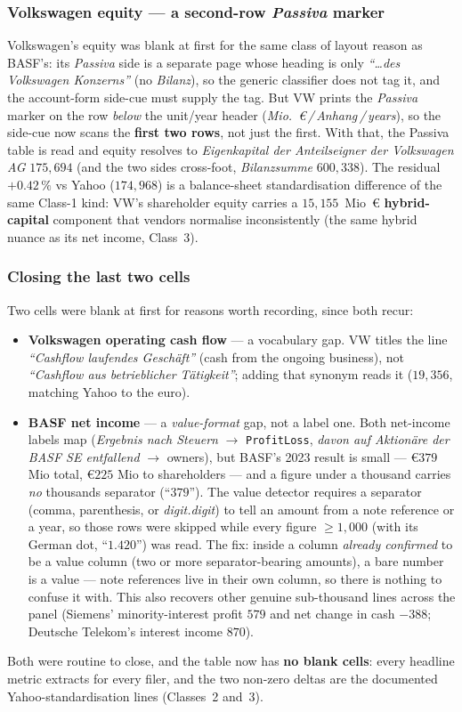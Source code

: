 \documentclass[11pt,a4paper]{report}
\begin{document}
\subsubsection*{Volkswagen equity --- a second-row \emph{Passiva} marker}
Volkswagen's equity was blank at first for the same class of layout reason as BASF's: its \emph{Passiva} side
is a separate page whose heading is only \emph{``\ldots des Volkswagen Konzerns''} (no \emph{Bilanz}), so the
generic classifier does not tag it, and the account-form side-cue must supply the tag. But VW prints the
\emph{Passiva} marker on the row \emph{below} the unit/year header (\emph{Mio.\ €\,/\,Anhang\,/\,years}), so
the side-cue now scans the \textbf{first two rows}, not just the first. With that, the Passiva table is read
and equity resolves to \emph{Eigenkapital der Anteilseigner der Volkswagen AG} $175{,}694$ (and the two sides
cross-foot, \emph{Bilanzsumme} $600{,}338$). The residual \textbf{$+0.42\,\%$} vs Yahoo ($174{,}968$) is a
balance-sheet standardisation difference of the same Class-1 kind: VW's shareholder equity carries a
$15{,}155$~Mio~€ \textbf{hybrid-capital} component that vendors normalise inconsistently (the same hybrid
nuance as its net income, Class~3).

\subsubsection*{Closing the last two cells}
Two cells were blank at first for reasons worth recording, since both recur:
\begin{itemize}
  \item \textbf{Volkswagen operating cash flow} --- a vocabulary gap. VW titles the line \emph{``Cashflow
    laufendes Gesch\"aft''} (cash from the ongoing business), not \emph{``Cashflow aus betrieblicher
    T\"atigkeit''}; adding that synonym reads it ($19{,}356$, matching Yahoo to the euro).
  \item \textbf{BASF net income} --- a \emph{value-format} gap, not a label one. Both net-income labels map
    (\emph{Ergebnis nach Steuern} $\to$ \texttt{ProfitLoss}, \emph{davon auf Aktion\"are der BASF SE entfallend}
    $\to$ owners), but BASF's 2023 result is small --- €$379$ Mio total, €$225$ Mio to shareholders --- and a
    figure under a thousand carries \emph{no} thousands separator (``$379$''). The value detector requires a
    separator (comma, parenthesis, or \emph{digit.digit}) to tell an amount from a note reference or a year, so
    those rows were skipped while every figure $\ge 1{,}000$ (with its German dot, ``$1.420$'') was read. The
    fix: inside a column \emph{already confirmed} to be a value column (two or more separator-bearing amounts),
    a bare number is a value --- note references live in their own column, so there is nothing to confuse it
    with. This also recovers other genuine sub-thousand lines across the panel (Siemens' minority-interest
    profit $579$ and net change in cash $-388$; Deutsche Telekom's interest income $870$).
\end{itemize}
Both were routine to close, and the table now has \textbf{no blank cells}: every headline metric extracts for
every filer, and the two non-zero deltas are the documented Yahoo-standardisation lines (Classes~2 and~3).
\end{document}
